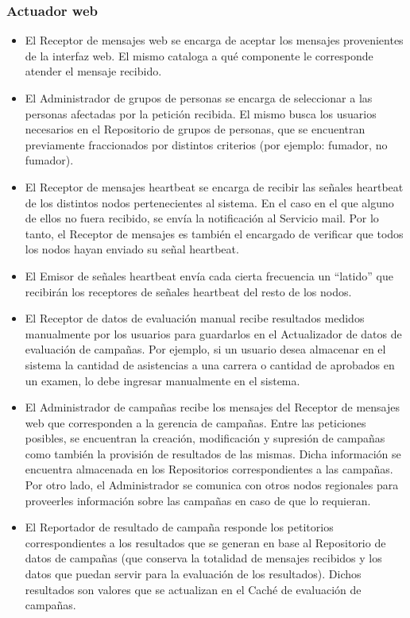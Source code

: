 \documentclass[a4paper, 10pt, twoside]{article}
\begin{document}
\subsubsection{Actuador web}

\begin{itemize}
\item El Receptor de mensajes web se encarga de aceptar los mensajes provenientes de la interfaz web. El mismo cataloga a qué componente le corresponde atender el mensaje recibido.
\item El Administrador de grupos de personas se encarga de seleccionar a las personas afectadas por la petición recibida. El mismo busca los usuarios necesarios en el Repositorio de grupos de personas, que se encuentran previamente fraccionados por distintos criterios (por ejemplo: fumador, no fumador).
\item El Receptor de mensajes heartbeat se encarga de recibir las señales heartbeat de los distintos nodos pertenecientes al sistema. En el caso en el que alguno de ellos no fuera recibido, se envía la notificación al Servicio mail. Por lo tanto, el Receptor de mensajes es también el encargado de verificar que todos los nodos hayan enviado su señal heartbeat.
\item El Emisor de señales heartbeat envía cada cierta frecuencia un ``latido'' que recibirán los receptores de señales heartbeat del resto de los nodos.
\item El Receptor de datos de evaluación manual recibe resultados medidos manualmente por los usuarios para guardarlos en el Actualizador de datos de evaluación de campañas. Por ejemplo, si un usuario desea almacenar en el sistema la cantidad de asistencias a una carrera o cantidad de aprobados en un examen, lo debe ingresar manualmente en el sistema.
\item El Administrador de campañas recibe los mensajes del Receptor de mensajes web que corresponden a la gerencia de campañas. Entre las peticiones posibles, se encuentran la creación, modificación y supresión de campañas como también la provisión de resultados de las mismas. Dicha información se encuentra almacenada en los Repositorios correspondientes a las campañas. Por otro lado, el Administrador se comunica con otros nodos regionales para proveerles información sobre las campañas en caso de que lo requieran.
\item El Reportador de resultado de campaña responde los petitorios correspondientes a los resultados que se generan en base al Repositorio de datos de campañas (que conserva la totalidad de mensajes recibidos y los datos que puedan servir para la evaluación de los resultados). Dichos resultados son valores que se actualizan en el Caché de evaluación de campañas.
\end{itemize}
\end{document}
